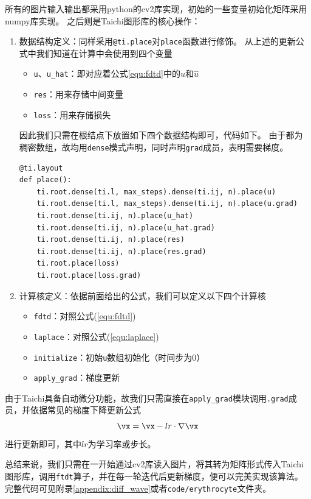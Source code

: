 \documentclass[thesis]{thesis}
\begin{document}
所有的图片输入输出都采用python的cv2库实现，初始的一些变量初始化矩阵采用numpy库实现。
之后则是Taichi图形库的核心操作：
\begin{enumerate}
    \item 数据结构定义：同样采用\verb'@ti.place'对\verb'place'函数进行修饰。
    从上述的更新公式中我们知道在计算中会使用到四个变量
    \begin{itemize}
        \item \verb'u'、\verb'u_hat'：即对应着公式\ref{equ:fdtd}中的$u$和$\hat{u}$
        \item \verb'res'：用来存储中间变量
        \item \verb'loss'：用来存储损失
    \end{itemize}
    因此我们只需在根结点下放置如下四个数据结构即可，代码如下。
    由于都为稠密数组，故均用\verb'dense'模式声明，同时声明\verb'grad'成员，表明需要梯度。
\begin{lstlisting}
@ti.layout
def place():
    ti.root.dense(ti.l, max_steps).dense(ti.ij, n).place(u)
    ti.root.dense(ti.l, max_steps).dense(ti.ij, n).place(u.grad)
    ti.root.dense(ti.ij, n).place(u_hat)
    ti.root.dense(ti.ij, n).place(u_hat.grad)
    ti.root.dense(ti.ij, n).place(res)
    ti.root.dense(ti.ij, n).place(res.grad)
    ti.root.place(loss)
    ti.root.place(loss.grad)
\end{lstlisting}
    \item 计算核定义：依据前面给出的公式，我们可以定义以下四个计算核
    \begin{itemize}
        \item \verb'fdtd'：对照公式(\ref{equ:fdtd})
        \item \verb'laplace'：对照公式(\ref{equ:laplace})
        \item \verb'initialize'：初始\verb'u'数组初始化（时间步为$0$）
        \item \verb'apply_grad'：梯度更新
    \end{itemize}
\end{enumerate}

由于Taichi具备自动微分功能，故我们只需直接在\verb'apply_grad'模块调用\verb'.grad'成员，并依据常见的梯度下降更新公式
\begin{equation}
\vx = \vx - lr \cdot \nabla\vx
\end{equation}
进行更新即可，其中$lr$为学习率或步长。

总结来说，我们只需在一开始通过cv2库读入图片，将其转为矩阵形式传入Taichi图形库，调用\verb'ftdt'算子，并在每一轮迭代后更新梯度，便可以完美实现该算法。
完整代码可见附录\ref{appendix:diff_wave}或者\verb'code/erythrocyte'文件夹。
\end{document}
